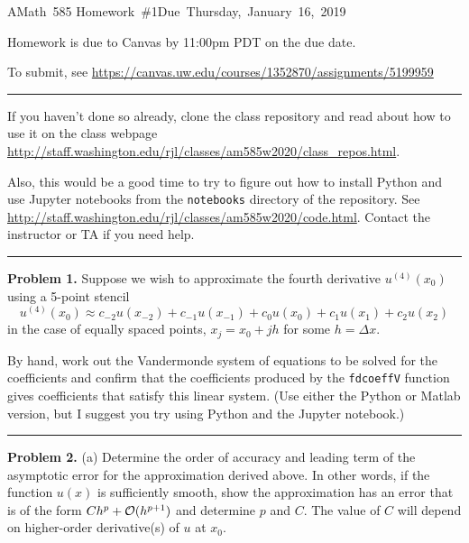 \documentclass[10pt]{article}
\begin{document}
\hfill\vbox{\hbox{AMath 585}
\hbox{Homework \#1}\hbox{Due Thursday, January 16, 2019}}

\vskip 5pt

Homework is due to Canvas by 11:00pm PDT on the due date.

To submit, see
\url{https://canvas.uw.edu/courses/1352870/assignments/5199959}


\vskip 0.5cm
\hrule

If you haven't done so already, clone the class repository and read about how 
to use it on the class webpage
\url{http://staff.washington.edu/rjl/classes/am585w2020/class_repos.html}.

Also, this would be a good time to try to figure out how to install Python
and use Jupyter notebooks from the {\tt notebooks} directory
of the repository.  See 
\url{http://staff.washington.edu/rjl/classes/am585w2020/code.html}.
Contact the instructor or TA if you need help.



\vskip 1cm
\hrule
{\bf Problem 1.}
Suppose we wish to approximate the fourth derivative $u^{(4)}(x_0)$ 
using a 5-point stencil
\[
u^{(4)}(x_0) \approx c_{-2} u(x_{-2}) + c_{-1} u(x_{-1}) + c_0 u(x_0) + c_1 u(x_1)
                   + c_2 u(x_2)
\]
in the case of equally spaced points, $x_j = x_0 + jh$ for some
$h = \Delta x$.

By hand, work out the Vandermonde system of equations to be solved for the
coefficients and confirm that the coefficients produced by the 
{\tt fdcoeffV} function gives coefficients that satisfy this linear system.
(Use either the Python or Matlab version, but I suggest you try using Python
and the Jupyter notebook.)




\vskip 1cm
\hrule
{\bf Problem 2.}
(a) Determine the order of accuracy and leading term of the asymptotic error for
the approximation derived above.  In other words, if
the function $u(x)$ is sufficiently smooth, show the approximation has an error
that is of the form $C h^p + {\cal O}(h^{p+1})$ and determine $p$ and $C$.
The value of $C$ will depend on higher-order derivative(s) of $u$ at $x_0$.
\end{document}
